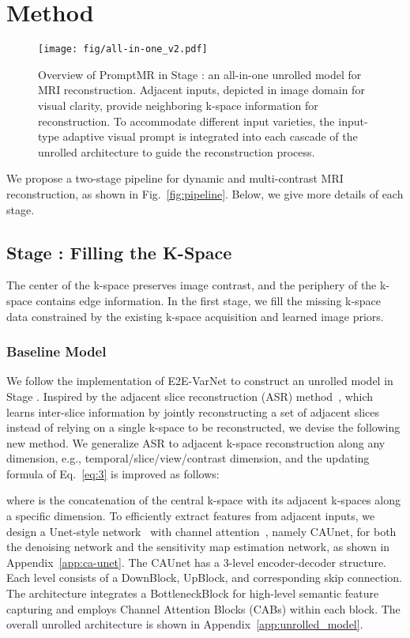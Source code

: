 \documentclass[runningheads]{llncs}
\newcommand{\RNum}[1]{\uppercase\expandafter{\romannumeral #1\relax}}
\begin{document}
\section{Method}

\begin{figure*}[t!]
\centering
\texttt{[image: fig/all-in-one\_v2.pdf]}
\caption{Overview of PromptMR in Stage \RNum{1}: an all-in-one unrolled model for MRI reconstruction. Adjacent inputs, depicted in image domain for visual clarity, provide neighboring k-space information for reconstruction. To accommodate different input varieties, the input-type adaptive visual prompt is integrated into each cascade of the unrolled architecture to guide the reconstruction process.}
\label{fig:all-in-one}
\end{figure*}

We propose a two-stage pipeline for dynamic and multi-contrast MRI reconstruction, as shown in Fig.~\ref{fig:pipeline}. Below, we give more details of each stage.


\subsection{Stage \RNum{1}: Filling the K-Space}
The center of the k-space preserves image contrast, and the periphery of the k-space contains edge information. In the first stage, we fill the missing k-space data constrained by the existing k-space acquisition and learned image priors.

\subsubsection{Baseline Model}
We follow the implementation of E2E-VarNet \cite{sriram2020end} to construct an unrolled model in Stage \RNum{1}.
Inspired by the adjacent slice reconstruction (ASR) method~\cite{fabian2022humus}, which learns inter-slice information by jointly reconstructing a set of adjacent slices instead of relying on a single k-space to be reconstructed, we devise the following new method. We generalize ASR to adjacent k-space reconstruction along any dimension, e.g., temporal/slice/view/contrast dimension, and the updating formula of Eq.~\ref{eq:3} is improved as follows:

where  is the concatenation of the central k-space  with its  adjacent k-spaces along a specific dimension. 
To efficiently extract features from adjacent inputs, we design a Unet-style network~\cite{ronneberger2015u} with channel attention~\cite{hu2018squeeze,huang2019mri}, namely CAUnet,  for both the denoising network  and the sensitivity map estimation network, as shown in Appendix~\ref{app:ca-unet}. The CAUnet has a 3-level encoder-decoder structure. Each level consists of a DownBlock, UpBlock, and corresponding skip connection. The architecture integrates a BottleneckBlock for high-level semantic feature capturing and employs Channel Attention Blocks (CABs) within each block. The overall unrolled architecture is shown in Appendix~\ref{app:unrolled_model}.
\end{document}
